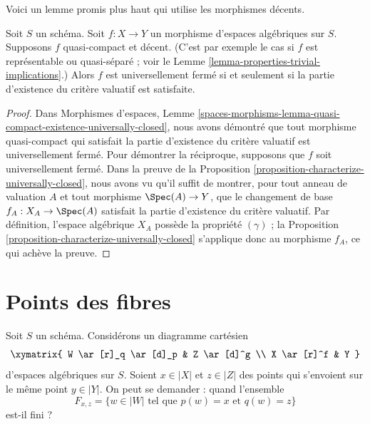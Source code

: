 \noindent
Voici un lemme promis plus haut qui utilise les morphismes décents.

\begin{lemma}
\label{lemma-re-characterize-universally-closed}
Soit $S$ un schéma.
Soit $f : X \to Y$ un morphisme d'espaces algébriques sur $S$.
Supposons $f$ quasi-compact et décent.
(C'est par exemple le cas si $f$ est représentable ou quasi-séparé ; voir le
Lemme \ref{lemma-properties-trivial-implications}.)
Alors $f$ est universellement fermé si et seulement si la partie d'existence
du critère valuatif est satisfaite.
\end{lemma}

\begin{proof}
Dans
Morphismes d'espaces,
Lemme \ref{spaces-morphisms-lemma-quasi-compact-existence-universally-closed},
nous avons démontré que tout morphisme quasi-compact qui satisfait la partie
d'existence du critère valuatif est universellement fermé.
Pour démontrer la réciproque, supposons que $f$ soit universellement fermé.
Dans la preuve de la
Proposition \ref{proposition-characterize-universally-closed},
nous avons vu qu'il suffit de montrer, pour tout anneau de valuation $A$ et
tout morphisme $\Spec(A) \to Y$, que le changement de base
$f_A : X_A \to \Spec(A)$ satisfait la partie d'existence du critère valuatif.
Par définition, l'espace algébrique $X_A$ possède la propriété $(\gamma)$ ; la
Proposition \ref{proposition-characterize-universally-closed}
s'applique donc au morphisme $f_A$, ce qui achève la preuve.
\end{proof}





\section{Points des fibres}
\label{section-points-fibres}

\noindent
Soit $S$ un schéma. Considérons un diagramme cartésien
\begin{equation}
\label{equation-points-fibres}
\xymatrix{
W \ar[r]_q \ar[d]_p & Z \ar[d]^g \\
X \ar[r]^f & Y
}
\end{equation}
d'espaces algébriques sur $S$. Soient $x \in |X|$ et $z \in |Z|$
des points qui s'envoient sur le même point $y \in |Y|$. On peut se demander :
quand l'ensemble
\begin{equation}
\label{equation-fibre}
F_{x, z} = \{ w \in |W| \text{ tel que }p(w) = x\text{ et }q(w) = z\}
\end{equation}
est-il fini ?

